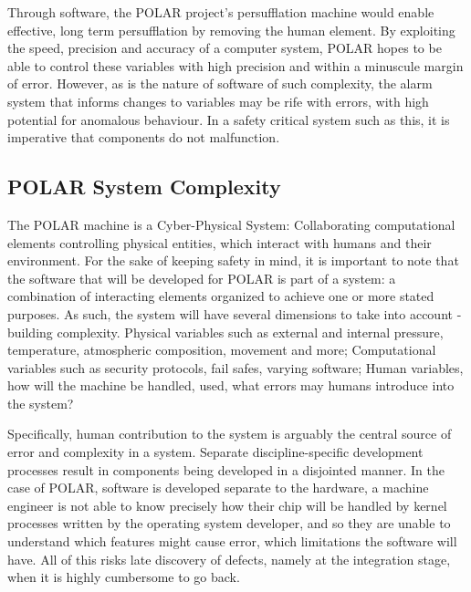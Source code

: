 Through software, the POLAR project's persufflation machine would enable effective, long term persufflation by removing the human element. By exploiting the speed, precision and accuracy of a computer system, POLAR hopes to be able to control these variables with high precision and within a minuscule margin of error. However, as is the nature of software of such complexity, the alarm system that informs changes to variables may be rife with errors, with high potential for anomalous behaviour\parencite{JamiaOCW154}. In a safety critical system such as this, it is imperative that components do not malfunction.


\subsection{POLAR System Complexity}
The POLAR machine is a Cyber-Physical System: Collaborating computational elements controlling physical entities, which interact with humans and their environment. For the sake of keeping safety in mind, it is important to note that the software that will be developed for POLAR is part of a system: a combination of interacting elements organized to achieve one or more stated purposes\parencite{walden_roedler_forsberg_hamelin_shortell_2007}. As such, the system will have several dimensions to take into account - building complexity. Physical variables such as external and internal pressure, temperature, atmospheric composition, movement and more; Computational variables such as security protocols, fail safes, varying software; Human variables, how will the machine be handled, used, what errors may humans introduce into the system? 

Specifically, human contribution to the system is arguably the central source of error and complexity in a system. Separate discipline-specific development processes result in components being developed in a disjointed manner. In the case of POLAR, software is developed separate to the hardware, a machine engineer is not able to know precisely how their chip will be handled by kernel processes written by the operating system developer, and so they are unable to understand which features might cause error, which limitations the software will have. All of this risks late discovery of defects, namely at the integration stage, when it is highly cumbersome to go back. 

